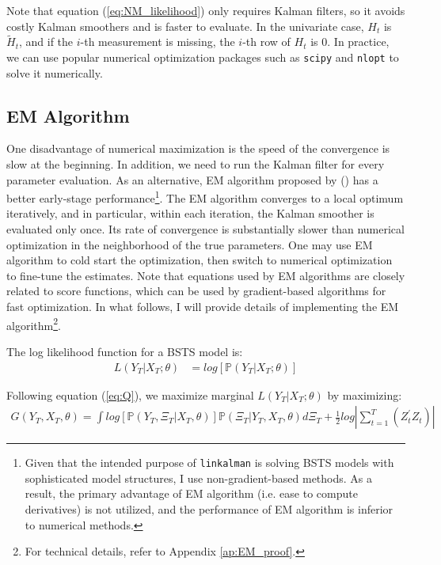 \documentclass[10pt, titlepage]{article}
\numberwithin{equation}{section}
\begin{document}
Note that equation (\ref{eq:NM_likelihood}) only requires Kalman filters, so it avoids costly Kalman smoothers and is faster to evaluate. In the univariate case, $H_t$ is $\tilde{H}_t$, and if the $i$-th measurement is missing, the $i$-th row of $H_t$ is $0$.  In practice, we can use popular numerical optimization packages such as \texttt{scipy} and \texttt{nlopt} to solve it numerically.

\subsection{EM Algorithm} \label{subsec:EM}
One disadvantage of numerical maximization is the speed of the convergence is slow at the beginning. In addition, we need to run the Kalman filter for every parameter evaluation. As an alternative, EM algorithm proposed by (\cite{shumway_stoffer_1982}) has a better early-stage performance\footnote{Given that the intended purpose of \texttt{linkalman} is solving BSTS models with sophisticated model structures, I use non-gradient-based methods. As a result, the primary advantage of EM algorithm (i.e. ease to compute derivatives) is not utilized, and the performance of EM algorithm is inferior to numerical methods.}. The EM algorithm converges to a local optimum iteratively, and in particular, within each iteration, the Kalman smoother is evaluated only once. Its rate of convergence is substantially slower than numerical optimization in the neighborhood of the true parameters. One may use EM algorithm to cold start the optimization, then switch to numerical optimization to fine-tune the estimates. Note that equations used by EM algorithms are closely related to score functions, which can be used by gradient-based algorithms for fast optimization. In what follows, I will provide details of implementing the EM algorithm\footnote{For technical details, refer to Appendix \ref{ap:EM_proof}.}.  

The log likelihood function for a BSTS model is:
\begin{align*}
    L(Y_T|X_T; \theta) &= log[\mathbb{P}(Y_T|X_T;\theta)]
\end{align*}

Following equation (\ref{eq:Q}), we maximize marginal $L(Y_T|X_T;\theta)$ by maximizing: 
\begin{align*}
    G(Y_T,X_T,\theta) = \int log[\mathbb{P}(Y_T,\Xi_T|X_T,\theta)]\mathbb{P}(\Xi_T|Y_T,X_T,\theta)d\Xi_T + \frac{1}{2}log\left|\sum_{t=1}^{T}(Z_t^{'}Z_t)\right| 
\end{align*}
\end{document}
